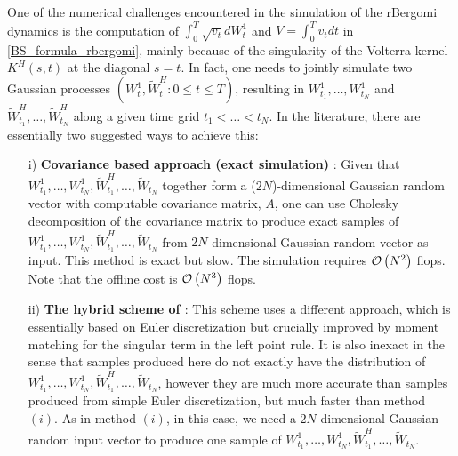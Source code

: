 

One of the numerical challenges encountered in the simulation of the rBergomi dynamics  is the computation of  $\int_{0}^{T} \sqrt{v_t} dW_t^1$ and $V=\int_{0}^{T} v_t dt$ in \eqref{BS_formula_rbergomi}, mainly because of the singularity of the Volterra kernel $K^H(s,t)$ at the diagonal $s = t$. In fact,  one needs to jointly simulate two Gaussian processes $(W_t^1, \widetilde{W}^H_t: 0 \le t \le T)$, resulting in $W^1_{t_1},\dots, W^1_{t_N}$ and $\widetilde{W}^H_{t_1},\dots, \widetilde{W}^H_{t_N}$ along a given time grid $t_1 <\dots < t_N$. In the literature, there are essentially two suggested ways to achieve this:
 \begin{enumerate}
 	
 	\item[i)] \textbf{Covariance based approach (exact simulation)} \cite{bayer2016pricing,bayer2018short}: Given that $W^1_{t_1},\dots, W^1_{t_N}, \widetilde{W}^H_{t_1},\dots, \widetilde{W}_{t_N}$ together form a ($2N$)-dimensional Gaussian random vector with computable covariance matrix, $A$, one can use Cholesky decomposition of the covariance matrix to produce exact samples of $W^1_{t_1},\dots, W^1_{t_N},\widetilde{W}^H_{t_1},\dots, \widetilde{W}_{t_N}$ from $2 N$-dimensional Gaussian random vector as  input. This method is exact but slow. The simulation  requires ${\mathcal{O}}\left(N^2\right)$ flops. Note that the offline cost is ${\mathcal{O}}\left(N^3\right)$ flops.
 	
 	\item[ii)]  \textbf{The hybrid scheme of \cite{bennedsen2017hybrid}}: This scheme uses a different approach, which is essentially based on  Euler discretization  but crucially improved by moment
 	matching for the singular term in the left point rule. It is also
 	inexact in the sense that samples produced here do not exactly have the distribution of $W^1_{t_1},\dots, W^1_{t_N}, \widetilde{W}^H_{t_1},\dots, \widetilde{W}_{t_N}$, however they are much more accurate than samples produced from simple Euler discretization, but much faster than method $(i)$. As in method $(i)$, in this case, we need a $2 N$-dimensional Gaussian random input vector to produce one 	sample of $W^1_{t_1},\dots, W^1_{t_N}, \widetilde{W}^H_{t_1},\dots, \widetilde{W}_{t_N}$.
 \end{enumerate}

